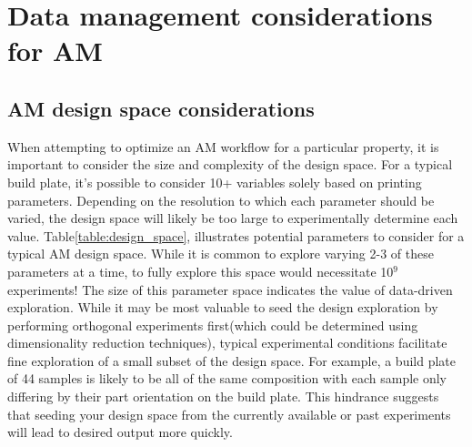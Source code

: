 \section{Data management considerations for AM}
\label{sec:DMC}

\subsection{AM design space considerations}
\label{subsec:DMC_design_space}
When attempting to optimize an AM workflow for a particular property, it is important to consider the size and complexity of the design space.
For a typical build plate, it's possible to consider 10+ variables solely based on printing parameters.
Depending on the resolution to which each parameter should be varied, the design space will likely be too large to experimentally determine each value.
Table\ref{table:design_space}, illustrates potential parameters to consider for a typical AM design space.
While it is common to explore varying 2-3 of these parameters at a time, to fully explore this space would necessitate 10$^9$ experiments!
The size of this parameter space indicates the value of data-driven exploration.
While it may be most valuable to seed the design exploration by performing orthogonal experiments first(which could be determined using dimensionality reduction techniques), typical experimental conditions facilitate fine exploration of a small subset of the design space.
For example, a build plate of 44 samples is likely to be all of the same composition with each sample only differing by their part orientation on the build plate.
This hindrance suggests that seeding your design space from the currently available or past experiments will lead to desired output more quickly.

